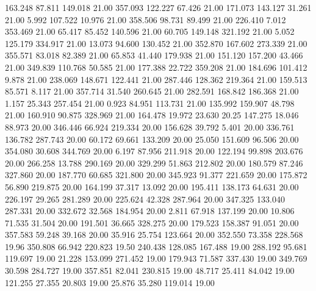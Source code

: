  163.248   87.811  149.018        21.00
 357.093  122.227   67.426        21.00
 171.073  143.127   31.261        21.00
   5.992  107.522   10.976        21.00
 358.506   98.731   89.499        21.00
 226.410    7.012  353.469        21.00
  65.417   85.452  140.596        21.00
  60.705  149.148  321.192        21.00
   5.052  125.179  334.917        21.00
  13.073   94.600  130.452        21.00
 352.870  167.602  273.339        21.00
 355.571   83.018   82.389        21.00
  65.853   41.440  179.938        21.00
 151.120  157.200   43.466        21.00
 349.839  110.768   50.585        21.00
 177.388   22.722  359.208        21.00
 184.696  101.412    9.878        21.00
 238.069  148.671  122.441        21.00
 287.446  128.362  219.364        21.00
 159.513   85.571    8.117        21.00
 357.714   31.540  260.645        21.00
 282.591  168.842  186.368        21.00
   1.157   25.343  257.454        21.00
   0.923   84.951  113.731        21.00
 135.992  159.907   48.798        21.00
 160.910   90.875  328.969        21.00
 164.478   19.972   23.630        20.25
 147.275   18.046   88.973        20.00
 346.446   66.924  219.334        20.00
 156.628   39.792    5.401        20.00
 336.761  136.782  287.743        20.00
  60.172   69.661  133.209        20.00
  25.050  151.609   96.506        20.00
 354.080   30.608  344.769        20.00
   6.197   87.956  211.918        20.00
 122.194   99.898  203.676        20.00
 266.258   13.788  290.169        20.00
 329.299   51.863  212.802        20.00
 180.579   87.246  327.860        20.00
 187.770   60.685  321.800        20.00
 345.923   91.377  221.659        20.00
 175.872   56.890  219.875        20.00
 164.199   37.317   13.092        20.00
 195.411  138.173   64.631        20.00
 226.197   29.265  281.289        20.00
 225.624   42.328  287.964        20.00
 347.325  133.040  287.331        20.00
 332.672   32.568  184.954        20.00
   2.811   67.918  137.199        20.00
  10.806   71.535   31.504        20.00
 191.501   36.665  328.275        20.00
 179.523  158.387   91.051        20.00
 357.583   59.248   39.168        20.00
  35.916   25.754  123.664        20.00
 352.550   73.358  228.568        19.96
 350.808   66.942  220.823        19.50
 240.438  128.085  167.488        19.00
 288.192   95.681  119.697        19.00
  21.228  153.099  271.452        19.00
 179.943   71.587  337.430        19.00
 349.769   30.598  284.727        19.00
 357.851   82.041  230.815        19.00
  48.717   25.411   84.042        19.00
 121.255   27.355   20.803        19.00
  25.876   35.280  119.014        19.00
